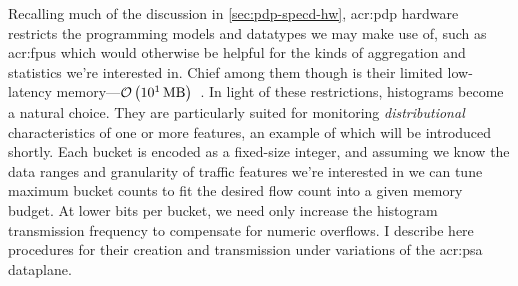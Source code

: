 






%

Recalling much of the discussion in \cref{sec:pdp-specd-hw}, \gls{acr:pdp} hardware restricts the programming models and datatypes we may make use of, such as \glspl{acr:fpu} which would otherwise be helpful for the kinds of aggregation and statistics we're interested in.
Chief among them though is their limited low-latency memory---$\mathcal{O}\left(\qty{e1}{\mega\byte}\right)$~\parencite{DBLP:conf/sosp/JinLZSLFKS17}.
In light of these restrictions, histograms become a natural choice.
They are particularly suited for monitoring \emph{distributional} characteristics of one or more features, an example of which will be introduced shortly.
Each bucket is encoded as a fixed-size integer, and assuming we know the data ranges and granularity of traffic features we're interested in we can tune maximum bucket counts to fit the desired flow count into a given memory budget.
At lower bits per bucket, we need only increase the histogram transmission frequency to compensate for numeric overflows.
I describe here procedures for their creation and transmission under variations of the \gls{acr:psa} dataplane.

